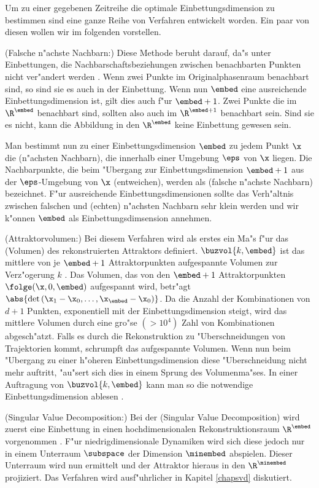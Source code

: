 Um zu einer gegebenen Zeitreihe die optimale Einbettungsdimension zu bestimmen sind eine
ganze Reihe von Verfahren entwickelt worden. Ein paar von diesen wollen wir im folgenden
vorstellen.
\begin{myitemize}
\item \rem(Falsche n"achste Nachbarn:) Diese Methode beruht darauf, da"s unter
  Einbettungen, die Nachbarschaftsbeziehungen zwischen benachbarten Punkten nicht
  ver\-"an\-dert werden \cite{Kennel92}. Wenn zwei Punkte im Originalphasenraum benachbart
  sind, so sind sie es auch in der Einbettung. Wenn nun $\embed$ eine ausreichende
  Einbettungsdimension ist, gilt dies auch f"ur $\embed+1$. Zwei Punkte die im $\R^\embed$
  benachbart sind, sollten also auch im $\R^{\embed+1}$ benachbart sein. Sind sie es
  nicht, kann die Abbildung in den $\R^\embed$ keine Einbettung gewesen sein.
  
  Man bestimmt nun zu einer Einbettungsdimension $\embed$ zu jedem Punkt $\x$ die
  \begriff(n"achsten Nachbarn), die innerhalb einer Umgebung $\eps$ von $\x$ liegen. Die
  Nachbarpunkte, die beim "Ubergang zur Einbettungsdimension $\embed+1$ aus der
  $\eps$-Umgebung von $\x$ \metapher(entweichen), werden als \begriff(falsche n"achste
  Nachbarn) bezeichnet. F"ur ausreichende Einbettungsdimensionen sollte das Verh"altnis
  zwischen falschen und \metapher(echten) n"achsten Nachbarn sehr klein werden und wir
  k"onnen $\embed$ als Einbettungsdimsension annehmen.
  
\item \rem(Attraktorvolumen:) Bei diesem Verfahren wird als erstes ein Ma"s f"ur das
  \metapher(Volumen) des rekonstruierten Attraktors definiert. $\buzvol{k,\embed}$ ist das
  mittlere von je $\embed+1$ Attraktorpunkten aufgespannte Volumen zur Verz"ogerung $k$ .
  Das Volumen, das von den $\embed+1$ Attraktorpunkten $\folge(\x,0,\embed)$ aufgespannt
  wird, betr"agt $\abs{\det\left(\x_1-\x_0,\dots,\x_\embed-\x_0\right)}$. Da die Anzahl
  der Kombinationen von $d+1$ Punkten, exponentiell mit der Einbettungsdimension steigt,
  wird das mittlere Volumen durch eine gro"se $(>10^4)$ Zahl von Kombinationen
  abgesch"atzt. Falls es durch die Rekonstruktion zu "Uberschneidungen von Trajektorien
  kommt, schrumpft das aufgespannte Volumen. Wenn nun beim "Ubergang zu einer h"oheren
  Einbettungsdimension diese "Uberschneidung nicht mehr auftritt, "au"sert sich dies in
  einem Sprung des Volumenma"ses. In einer Auftragung von $\buzvol{k,\embed}$ kann man so
  die notwendige Einbettungsdimension ablesen \cite{Buzug90a} \cite{Buzug94}.
\item \rem(Singular Value Decomposition:) Bei der \begriff(Singular Value Decomposition)
  wird zuerst eine Einbettung in einen hochdimensionalen Rekonstruktionsraum $\R^\embed$
  vorgenommen \cite{broomhead-king}. F"ur niedrigdimensionale Dynamiken wird sich diese
  jedoch nur in einem Unterraum $\subspace$ der Dimension $\minembed$ abspielen. Dieser
  Unterraum wird nun ermittelt und der Attraktor hieraus in den $\R^\minembed$ projiziert.
  Das Verfahren wird ausf"uhrlicher in Kapitel \ref{chapsvd} diskutiert.
\end{myitemize}
